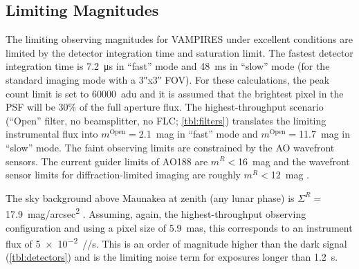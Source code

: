 \subsection{Limiting Magnitudes}

The limiting observing magnitudes for VAMPIRES under excellent conditions are limited by the detector integration time and saturation limit. The fastest detector integration time is \SI{7.2}{\micro\second} in ``fast'' mode and \SI{48}{\milli\second} in ``slow'' mode (for the standard imaging mode with a \ang{;;3}x\ang{;;3} FOV). For these calculations, the peak count limit is set to \SI{60000}{adu} and it is assumed that the brightest pixel in the PSF will be 30\% of the full aperture flux. The highest-throughput scenario (``Open'' filter, no beamsplitter, no FLC; \autoref{tbl:filters}) translates the limiting instrumental flux into $m^\mathrm{Open}=$\SI{2.1}{mag} in ``fast'' mode and $m^\mathrm{Open}=$\SI{11.7}{mag} in ``slow'' mode. The faint observing limits are constrained by the AO wavefront sensors. The current guider limits of AO188 are $m^R<$\SI{16}{mag} and the wavefront sensor limits for diffraction-limited imaging are roughly $m^R<$\SI{12}{mag} \citep{minowa_performance_2010}.

The sky background above Maunakea at zenith (any lunar phase) is $\Sigma^R=$\SI{17.9}{mag/arcsec^2} \citep{roth_measurements_2016}. Assuming, again, the highest-throughput observing configuration and using a pixel size of \SI{5.9}{mas}, this corresponds to an instrument flux of \SI{5e-2}{\electron/\pixel/\second}. This is an order of magnitude higher than the dark signal (\autoref{tbl:detectors}) and is the limiting noise term for exposures longer than \SI{1.2}{\second}.
